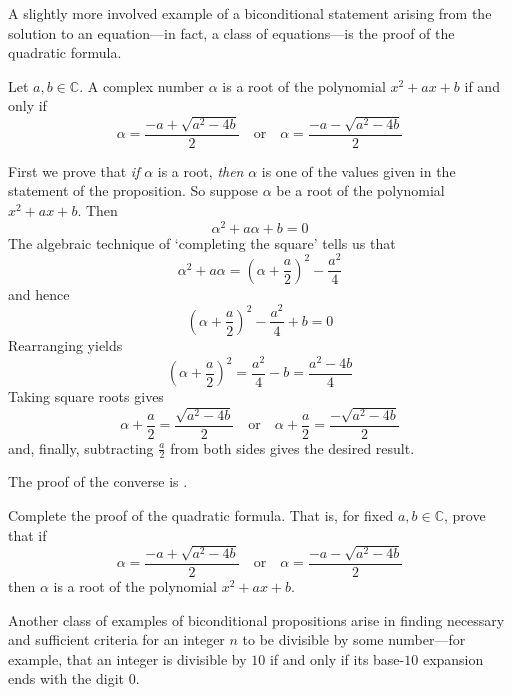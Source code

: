 A slightly more involved example of a biconditional statement arising from the solution to an equation---in fact, a class of equations---is the proof of the quadratic formula.

\begin{itheorem}
\label{thmQuadraticFormula}
Let $a,b \in \mathbb{C}$. A complex number $\alpha$ is a root of the polynomial $x^2+ax+b$ if and only if
\[
\alpha = \frac{-a+\sqrt{a^2-4b}}{2} \quad \text{or} \quad \alpha =\frac{-a-\sqrt{a^2-4b}}{2}
\]
\end{itheorem}

\begin{cproof}
First we prove that \textit{if} $\alpha$ is a root, \textit{then} $\alpha$ is one of the values given in the statement of the proposition. So suppose $\alpha$ be a root of the polynomial $x^2+ax+b$. Then
\[
\alpha^2 + a\alpha + b = 0
\]
The algebraic technique of `completing the square' tells us that
\[
\alpha^2 + a\alpha = \left( \alpha + \frac{a}{2} \right)^2 - \frac{a^2}{4}
\]
and hence
\[
\left( \alpha + \frac{a}{2} \right)^2 - \frac{a^2}{4} + b = 0
\]
Rearranging yields
\[
\left( \alpha + \frac{a}{2} \right)^2  = \frac{a^2}{4} - b = \frac{a^2-4b}{4}
\]
Taking square roots gives
\[
\alpha + \frac{a}{2} = \frac{\sqrt{a^2-4b}}{2} \quad \text{or} \quad \alpha + \frac{a}{2} = \frac{-\sqrt{a^2-4b}}{2}
\]
and, finally, subtracting $\frac{a}{2}$ from both sides gives the desired result.

The proof of the converse is .
\end{cproof}

\begin{exercise}
\label{exQuadraticFormulaConverse}
Complete the proof of the quadratic formula. That is, for fixed $a,b \in \mathbb{C}$, prove that if
\[
\alpha = \frac{-a+\sqrt{a^2-4b}}{2} \quad \text{or} \quad \alpha =\frac{-a-\sqrt{a^2-4b}}{2}
\]
then $\alpha$ is a root of the polynomial $x^2+ax+b$.
\end{exercise}

Another class of examples of biconditional propositions arise in finding necessary and sufficient criteria for an integer $n$ to be divisible by some number---for example, that an integer is divisible by $10$ if and only if its base-$10$ expansion ends with the digit $0$.

